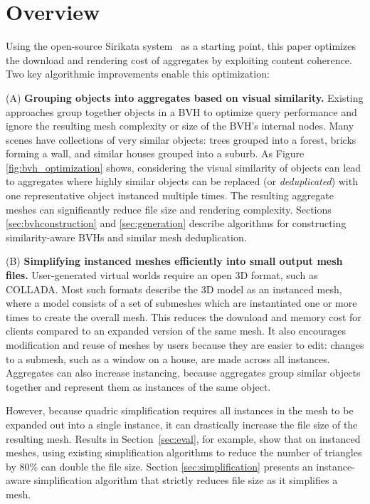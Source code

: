\section{Overview}
\label{sec:lbvh}

Using the open-source 
Sirikata system~\cite{ewencp2012} as a starting point, this paper
optimizes the download and rendering cost of aggregates by exploiting
content coherence. Two key
algorithmic improvements enable this optimization:



(A) \textbf{Grouping objects into aggregates based on visual similarity.}  
Existing approaches group
together objects in a BVH to optimize query performance and ignore the
resulting mesh complexity or size of the BVH's internal nodes. 
Many scenes have collections of very similar objects: trees grouped into a 
forest, bricks forming a wall, and similar houses
grouped into a suburb. As Figure \ref{fig:bvh_optimization} shows,
considering the visual similarity of objects can lead to aggregates
where highly similar objects can be replaced (or \emph{deduplicated}) 
with one representative object
instanced multiple times.  The resulting aggregate meshes can
significantly reduce file size and rendering complexity.  Sections
\ref{sec:bvhconstruction} and \ref{sec:generation} describe algorithms
for constructing similarity-aware BVHs and similar mesh deduplication.

(B) \textbf{Simplifying instanced meshes efficiently into small output
  mesh files.} User-generated virtual worlds require an open 3D
format, such as COLLADA. Most such formats describe the 3D model as an
instanced mesh, where a model consists of a set of submeshes which are
instantiated one or more times to create the overall mesh.  This
reduces the download and memory cost for clients compared to an
expanded version of the same mesh. It also encourages modification and
reuse of meshes by users because they are easier to edit: changes to a
submesh, such as a window on a house, are made across all instances.
Aggregates can also increase instancing, because aggregates group
similar objects together and represent them as instances of the same
object.

However, because quadric simplification requires all instances in the
mesh to be expanded out into a single instance, it can drastically
increase the file size of the resulting mesh. Results in
Section~\ref{sec:eval}, for example, show that on instanced meshes,
using existing simplification algorithms to reduce the number of triangles by 80\% 
can double the file size. Section \ref{sec:simplification} presents an
instance-aware simplification algorithm that strictly reduces file
size as it simplifies a mesh. 


